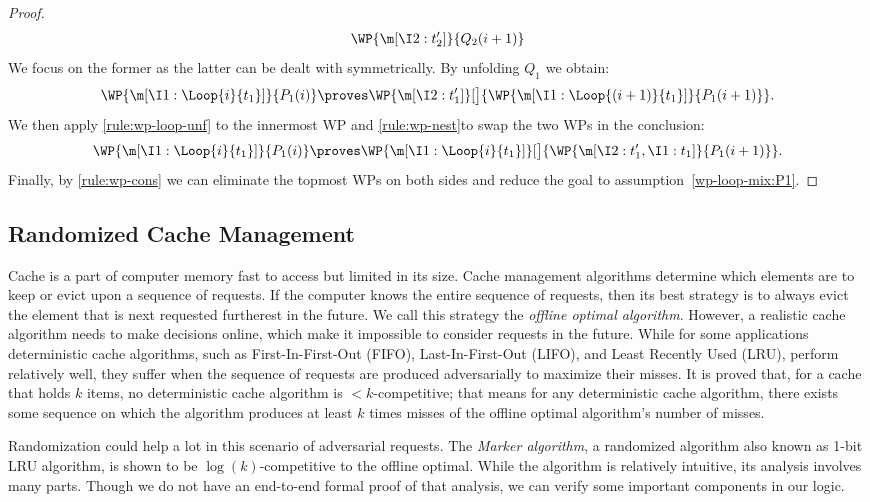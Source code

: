 \documentclass[acmsmall,nonacm,screen,appendix]{acmart}
\begin{document}
\begin{proof}
\begin{align*}
    \WP{\m[\I2: t_2']}{Q_2(i+1)}
  \end{align*}
  We focus on the former as the latter can be dealt with symmetrically.
  By unfolding $Q_1$ we obtain:
  \[
    \WP{\m[\I1: \Loop{i}{t_1}]}{P_1(i)}
    \proves
    \WP{\m[\I2: t_1']}[\big]{\WP{\m[\I1: \Loop{(i+1)}{t_1}]}{P_1(i+1)}}.
  \]
  We then apply \ref{rule:wp-loop-unf} to the innermost WP and \ref{rule:wp-nest}to swap the two WPs in the conclusion:
  \[
    \WP{\m[\I1: \Loop{i}{t_1}]}{P_1(i)}
    \proves
    \WP{\m[\I1: \Loop{i}{t_1}]}[\big]{\WP{\m[\I2: t_1', \I1: t_1]}{P_1(i+1)}}.
  \]
  Finally, by \ref{rule:wp-cons} we can eliminate the topmost WPs
  on both sides and reduce the goal to assumption~\eqref{wp-loop-mix:P1}.
\end{proof}
 
 







\subsection{Randomized Cache Management}
  

Cache is a part of computer memory fast to access but limited in its size.
Cache management algorithms determine which elements are to keep or
evict upon a sequence of requests.
If the computer knows the entire sequence of requests, then its best strategy is
to always evict the element that is next requested furtherest in the future.
We call this strategy the \emph{offline optimal algorithm}.
However, a realistic cache algorithm needs to make decisions
online, which make it impossible to consider requests in the future.
While for some applications deterministic
cache algorithms, such as First-In-First-Out (FIFO), Last-In-First-Out (LIFO),
and Least Recently Used (LRU), perform relatively well, they suffer when the
sequence of requests are produced adversarially to maximize their misses. It is
proved that, for a cache that holds $k$ items, no deterministic cache algorithm
is $< k$-competitive; that means for any deterministic cache algorithm, there
exists some sequence on which the algorithm produces at least $k$ times misses
of the offline optimal algorithm's number of misses.

Randomization could help a lot in this scenario of adversarial requests.
The \emph{Marker algorithm}, a randomized algorithm also known as 1-bit LRU algorithm,
is shown to be $\log(k)$-competitive to the offline optimal.
While the algorithm is relatively intuitive, its analysis involves many parts.
Though we do not have an end-to-end formal proof of that analysis,
we can verify some important components in our logic.
\end{document}
